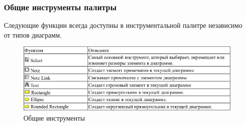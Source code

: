 \documentclass[a4paper,12pt]{report}
\begin{document}
\subsubsection*{Общие инструменты палитры}
Следующие функции всегда доступны в инструментальной палитре независимо от типов
диаграмм.
\begin{figure}[h!]
	\centering
	\includegraphics[width=1\linewidth]{images/commoninstruments}
	\caption{Общие инструменты}
	\label{fig:commoninstruments}
\end{figure}
\end{document}
